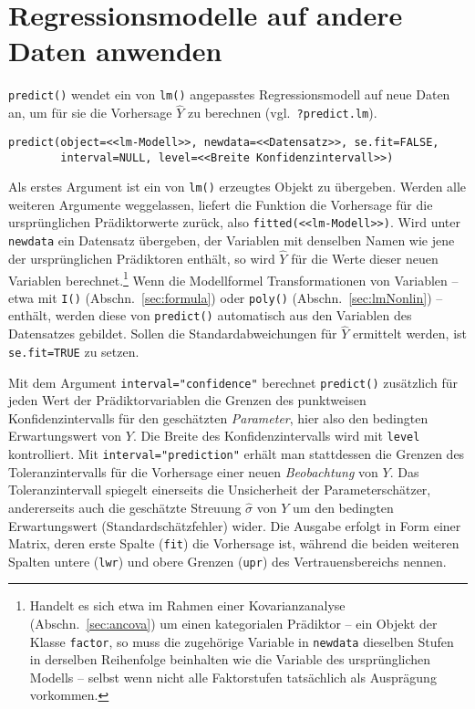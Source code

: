 \section{Regressionsmodelle auf andere Daten anwenden}
\label{sec:predict}

\lstinline!predict()! wendet ein von \lstinline!lm()! angepasstes Regressionsmodell auf neue Daten an, um für sie die Vorhersage $\hat{Y}$ zu berechnen (vgl.\ \lstinline!?predict.lm!).
\begin{lstlisting}
predict(object=<<lm-Modell>>, newdata=<<Datensatz>>, se.fit=FALSE,
        interval=NULL, level=<<Breite Konfidenzintervall>>)
\end{lstlisting}

Als erstes Argument ist ein von \lstinline!lm()! erzeugtes Objekt zu übergeben. Werden alle weiteren Argumente weggelassen, liefert die Funktion die Vorhersage für die ursprünglichen Prädiktorwerte zurück, also \lstinline!fitted(<<lm-Modell>>)!. Wird unter \lstinline!newdata! ein Datensatz übergeben, der Variablen mit denselben Namen wie jene der ursprünglichen Prädiktoren enthält, so wird $\hat{Y}$ für die Werte dieser neuen Variablen berechnet.\footnote{Handelt es sich etwa im Rahmen einer Kovarianzanalyse (Abschn.\ \ref{sec:ancova}) um einen kategorialen Prädiktor -- ein Objekt der Klasse \lstinline!factor!, so muss die zugehörige Variable in \lstinline!newdata! dieselben Stufen in derselben Reihenfolge beinhalten wie die Variable des ursprünglichen Modells -- selbst wenn nicht alle Faktorstufen tatsächlich als Ausprägung vorkommen.} Wenn die Modellformel Transformationen von Variablen -- etwa mit \lstinline!I()! (Abschn.\ \ref{sec:formula}) oder \lstinline!poly()! (Abschn.\ \ref{sec:lmNonlin}) -- enthält, werden diese von \lstinline!predict()! automatisch aus den Variablen des Datensatzes gebildet. Sollen die Standardabweichungen für $\hat{Y}$ ermittelt werden, ist \lstinline!se.fit=TRUE! zu setzen.

Mit dem Argument \lstinline!interval="confidence"! berechnet \lstinline!predict()! zusätzlich für jeden Wert der Prädiktorvariablen die Grenzen des punktweisen Konfidenzintervalls für den geschätzten \emph{Parameter}, hier also den bedingten Erwartungswert von $Y$. Die Breite des Konfidenzintervalls wird mit \lstinline!level! kontrolliert. Mit \lstinline!interval="prediction"! erhält man stattdessen die Grenzen des Toleranzintervalls für die Vorhersage einer neuen \emph{Beobachtung} von $Y$. Das Toleranzintervall spiegelt einerseits die Unsicherheit der Parameterschätzer, andererseits auch die geschätzte Streuung $\hat{\sigma}$ von $Y$ um den bedingten Erwartungswert (Standardschätzfehler) wider. Die Ausgabe erfolgt in Form einer Matrix, deren erste Spalte (\lstinline!fit!) die Vorhersage ist, während die beiden weiteren Spalten untere (\lstinline!lwr!) und obere Grenzen (\lstinline!upr!) des Vertrauensbereichs nennen.

